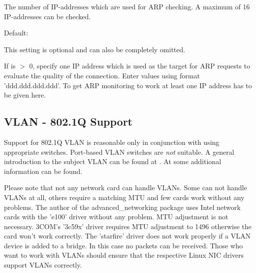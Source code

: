 \begin{description}
  The number of IP-addresses which are used for ARP checking.
  A maximum of 16 IP-addresses can be checked.
  

  Default: 

  This setting is optional and can also be completely omitted.

  If  is $>$ 0, specify
  one IP address which is used as the target for ARP requests 
  to evaluate the quality of the connection. Enter values using
  format 'ddd.ddd.ddd.ddd'. To get ARP monitoring to work at least one 
  IP address has to be given here.
  
\end{description}

{
\subsection {VLAN - 802.1Q Support}
}

Support for 802.1Q VLAN is reasonable only in conjunction with
using appropriate switches. Port-based VLAN switches are
\emph{not} suitable. A general introduction to the subject
VLAN can be found at
.
At  some additional
information can be found.

Please note that not any network card can handle VLANs. Some can not 
handle VLANs at all, others require a matching MTU and few cards work
without any problems. The author of the advanced\_networking package
uses Intel network cards with the 'e100' driver without any problem.
MTU adjustment is not necessary. 3COM's '3c59x' driver
requires MTU adjustment to 1496 otherwise the card won't work
correctly. The 'starfire' driver does not work properly if a VLAN 
device is added to a bridge. In this case no packets can be received.
Those who want to work with VLANs should ensure that the respective
Linux NIC drivers support VLANs correctly.


